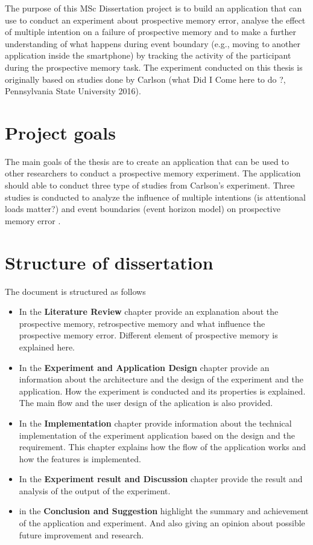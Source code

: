 The purpose of this MSc Dissertation project is to build an application that can use to conduct an experiment about prospective memory error, analyse the effect of multiple intention on a failure of prospective memory and to make a further understanding of what happens
during event boundary (e.g., moving to another application inside the smartphone) by tracking the activity of the participant during the prospective memory task.
The experiment conducted on this thesis is originally based on studies done by Carlson (what Did I Come here to do ?, Pennsylvania State University 2016).


\section{Project goals}
The main goals of the thesis are to create an application that can be used to other researchers to conduct a prospective memory experiment.
The application should able to conduct three type of studies from Carlson's experiment.
Three studies is conducted to analyze the influence of multiple intentions (is attentional loads matter?) and event boundaries (event horizon model)
on prospective memory error .

\section{Structure of dissertation}

The document is structured as follows
\begin{itemize}
\item In the \textbf{Literature Review} chapter provide an explanation about the prospective memory, retrospective memory and what influence the prospective memory error.
Different element of prospective memory is explained here.

\item In the \textbf{Experiment and Application Design} chapter provide an information about the architecture and the design of the experiment and the application.
How the experiment is conducted and its properties is explained. The main flow and the user design of the aplication is also provided.

\item In the \textbf{Implementation} chapter provide information about the technical implementation of the experiment application based on the design and the requirement.
 This chapter explains how the flow of the application works and how the features is implemented.

\item In the \textbf{Experiment result and Discussion} chapter provide the result and analysis of the output of the experiment.

\item in the \textbf{Conclusion and Suggestion} highlight the summary and achievement of the application and experiment. And also giving an opinion about possible future improvement and research.


\end{itemize}

